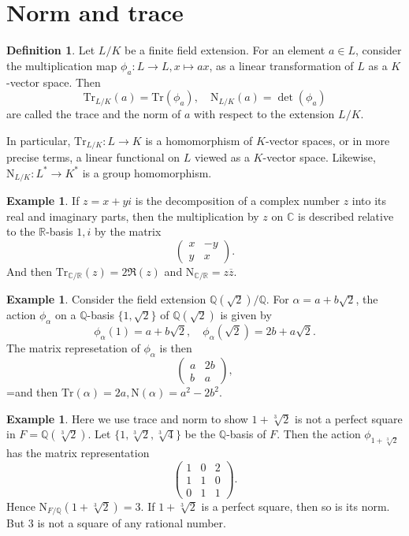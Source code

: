 \documentclass[12pt]{report}
\theoremstyle{definition}
\newtheorem{defn}[thm]{Definition}
\newtheorem{example}[thm]{Example}
\def\CC{\mathbb{C}}
\def\QQ{\mathbb{Q}}
\def\RR{\mathbb{R}}
\def\Tr{\text{Tr}}
\def\nm{\text{N}}
\def\aa{\alpha}
\begin{document}
\section{Norm and trace}

\begin{defn}
    Let $L/K$ be a finite field extension. For an element $a \in L$, consider the multiplication map $\phi_a : L \to L, x \mapsto ax$, as a linear transformation of $L$ as a $K$-vector space. Then $$\Tr_{L/K}(a)= \Tr(\phi_a),\quad \nm_{L/K}(a) = \det(\phi_a)$$ are called the trace and the norm of $a$ with respect to the extension $L/K$.
\end{defn}

In particular, $\Tr_{L/K} : L \to K$ is a homomorphism of $K$-vector spaces, or in more precise terms, a linear functional on $L$ viewed as a $K$-vector space. Likewise, $\nm_{L/K} : L^* \to K^*$ is a group homomorphism.

\begin{example}
    If $z = x+yi$ is the decomposition of a complex number $z$ into its real and imaginary parts, then the multiplication by $z$ on $\CC$ is described relative to the $\RR$-basis $1, i$ by the matrix $$    \begin{pmatrix}
      x & -y \\
      y &  x
    \end{pmatrix}.$$
    And then $\Tr_{\CC/\RR}(z)= 2\Re(z)$ and $\nm_{\CC/\RR} = z\overline{z}$.
\end{example}

\begin{example}
    Consider the field extension $\QQ(\sqrt{2})/\QQ$. For $\aa=a+b\sqrt{2}$, the action $\phi_\aa$ on a $\QQ$-basis $\{1,\sqrt{2}\}$ of $\QQ(\sqrt{2})$ is given by $$\phi_\aa(1)=a+b\sqrt{2},\quad \phi_\aa(\sqrt{2})=2b+a\sqrt{2}.$$ The matrix represetation of $\phi_\aa$ is then $$\begin{pmatrix}
        a & 2b\\
        b & a
    \end{pmatrix},$$=and then $\Tr(\aa)=2a, \nm(\aa)=a^2-2b^2.$
\end{example}

\begin{example}
    Here we use trace and norm to show $1+\sqrt[3]{2}$ is not a perfect square in $F=\QQ(\sqrt[3]{2})$. Let $\{1,\sqrt[3]{2},\sqrt[3]{4}\}$ be the $\QQ$-basis of $F$. Then the action $\phi_{1+\sqrt[3]{2}}$ has the matrix representation $$\begin{pmatrix}
        1 & 0 & 2\\
        1 & 1 & 0\\
        0 & 1& 1
    \end{pmatrix}.$$
    Hence $\nm_{F/\QQ}(1+\sqrt[3]{2}) =  3$. If $1+\sqrt[3]{2}$ is a perfect square, then so is its norm. But 3 is not a square of any rational number.  
\end{example}
\end{document}
